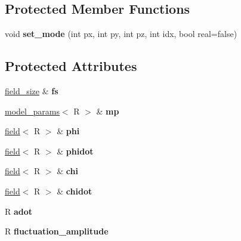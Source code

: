 \subsection*{Protected Member Functions}
\begin{DoxyCompactItemize}
\item 
\hypertarget{classle__style__initializer_a09d23f6c1d975bf47d0664e195ef839e}{
void {\bfseries set\_\-mode} (int px, int py, int pz, int idx, bool real=false)}
\label{classle__style__initializer_a09d23f6c1d975bf47d0664e195ef839e}

\end{DoxyCompactItemize}
\subsection*{Protected Attributes}
\begin{DoxyCompactItemize}
\item 
\hypertarget{classle__style__initializer_a62611c6bf34270cc824bff07ae43560d}{
\hyperlink{structfield__size}{field\_\-size} \& {\bfseries fs}}
\label{classle__style__initializer_a62611c6bf34270cc824bff07ae43560d}

\item 
\hypertarget{classle__style__initializer_a73c082652784c51599ead4c6608556a7}{
\hyperlink{structmodel__params}{model\_\-params}$<$ R $>$ \& {\bfseries mp}}
\label{classle__style__initializer_a73c082652784c51599ead4c6608556a7}

\item 
\hypertarget{classle__style__initializer_a82ffd836af9e74646e87a0a8ec2b19ae}{
\hyperlink{classfield}{field}$<$ R $>$ \& {\bfseries phi}}
\label{classle__style__initializer_a82ffd836af9e74646e87a0a8ec2b19ae}

\item 
\hypertarget{classle__style__initializer_a9a1febad9cec5260d4feda55156277ba}{
\hyperlink{classfield}{field}$<$ R $>$ \& {\bfseries phidot}}
\label{classle__style__initializer_a9a1febad9cec5260d4feda55156277ba}

\item 
\hypertarget{classle__style__initializer_aac6d2b31590a8f21ffbc98a678e35c5f}{
\hyperlink{classfield}{field}$<$ R $>$ \& {\bfseries chi}}
\label{classle__style__initializer_aac6d2b31590a8f21ffbc98a678e35c5f}

\item 
\hypertarget{classle__style__initializer_afda2afd595b91480ac13655fbf3cd891}{
\hyperlink{classfield}{field}$<$ R $>$ \& {\bfseries chidot}}
\label{classle__style__initializer_afda2afd595b91480ac13655fbf3cd891}

\item 
\hypertarget{classle__style__initializer_a8023c235401ca9873ae08ab3b73cf348}{
R {\bfseries adot}}
\label{classle__style__initializer_a8023c235401ca9873ae08ab3b73cf348}

\item 
\hypertarget{classle__style__initializer_ab5113f6fdc28a74399d2ec26d8875e45}{
R {\bfseries fluctuation\_\-amplitude}}
\label{classle__style__initializer_ab5113f6fdc28a74399d2ec26d8875e45}

\end{DoxyCompactItemize}
